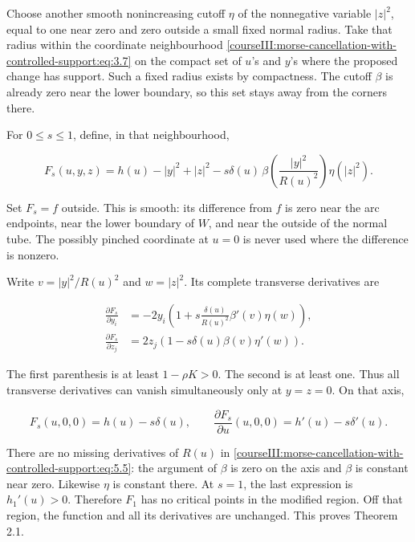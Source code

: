 Choose another smooth nonincreasing cutoff \(\eta\) of the nonnegative variable \(|z|^2\), equal to one near zero and zero outside a small fixed normal radius. Take that radius within the coordinate neighbourhood \eqref{courseIII:morse-cancellation-with-controlled-support:eq:3.7} on the compact set of \(u\)'s and \(y\)'s where the proposed change has support. Such a fixed radius exists by compactness. The cutoff \(\beta\) is already zero near the lower boundary, so this set stays away from the corners there.

For \(0\leq s\leq1\), define, in that neighbourhood,

\begin{equation}
F_s(u,y,z)=h(u)-|y|^2+|z|^2
-s\delta(u)\,
\beta\!\left(\frac{|y|^2}{R(u)^2}\right)\eta(|z|^2).
\label{courseIII:morse-cancellation-with-controlled-support:eq:5.3}
\end{equation}

Set \(F_s=f\) outside. This is smooth: its difference from \(f\) is zero near the arc endpoints, near the lower boundary of \(W\), and near the outside of the normal tube. The possibly pinched coordinate at \(u=0\) is never used where the difference is nonzero.

Write \(v=|y|^2/R(u)^2\) and \(w=|z|^2\). Its complete transverse derivatives are

\begin{equation}
\begin{aligned}
\frac{\partial F_s}{\partial y_i}
&=-2y_i\left(1+s\frac{\delta(u)}{R(u)^2}\beta'(v)\eta(w)\right),\\
\frac{\partial F_s}{\partial z_j}
&=2z_j\left(1-s\delta(u)\beta(v)\eta'(w)\right).
\end{aligned}
\label{courseIII:morse-cancellation-with-controlled-support:eq:5.4}
\end{equation}

The first parenthesis is at least \(1-\rho K>0\). The second is at least one. Thus all transverse derivatives can vanish simultaneously only at \(y=z=0\). On that axis,

\begin{equation}
F_s(u,0,0)=h(u)-s\delta(u),
\qquad
\frac{\partial F_s}{\partial u}(u,0,0)=h'(u)-s\delta'(u).
\label{courseIII:morse-cancellation-with-controlled-support:eq:5.5}
\end{equation}

There are no missing derivatives of \(R(u)\) in \eqref{courseIII:morse-cancellation-with-controlled-support:eq:5.5}: the argument of \(\beta\) is zero on the axis and \(\beta\) is constant near zero. Likewise \(\eta\) is constant there. At \(s=1\), the last expression is \(h_1'(u)>0\). Therefore \(F_1\) has no critical points in the modified region. Off that region, the function and all its derivatives are unchanged. This proves Theorem 2.1.

